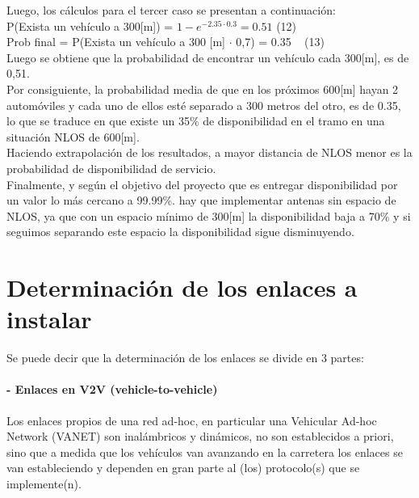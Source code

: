 \documentclass[12pt]{article}
\begin{document}
Luego, los cálculos para el tercer caso se presentan a continuación:\\

P(Exista un vehículo a 300[m]) = $1-e^{-2.35 \cdot 0.3} = 0.51$ \qquad \qquad \qquad
\footnotesize (12) \normalsize \\

Prob final = P(Exista un vehículo a 300 [m] $\cdot$ 0,7) = 0.35 \qquad \ \qquad 
\footnotesize (13) \normalsize\\

Luego se obtiene que la probabilidad de encontrar un vehículo cada 300[m], es de 0,51.\\

Por consiguiente, la probabilidad media de que en los próximos 600[m] hayan 2 automóviles y cada uno 
de ellos esté separado a 300 metros del otro, es de 0.35, lo que se traduce en que existe un 35\% de 
disponibilidad en el tramo en una situación NLOS de 600[m].\\

Haciendo extrapolación de los resultados, a mayor distancia de NLOS menor es la probabilidad de 
disponibilidad de servicio.\\

Finalmente, y según el objetivo del proyecto que es entregar disponibilidad por un valor lo más cercano 
a 99.99\%. hay que implementar antenas sin espacio de NLOS, ya que con un espacio mínimo de 300[m] la 
disponibilidad baja a 70\% y si seguimos separando este espacio la disponibilidad sigue disminuyendo.\\

\newpage
\section{Determinación de los enlaces a instalar}
Se puede decir que la determinación de los enlaces se divide en 3 partes:

\paragraph{- Enlaces en V2V (vehicle-to-vehicle)\\}
Los enlaces propios de una red ad-hoc, en particular una Vehicular Ad-hoc Network (VANET) son 
inalámbricos y dinámicos, no son 
establecidos a priori, sino que a medida que los vehículos van avanzando en la carretera los enlaces se 
van estableciendo y dependen en gran parte al (los) protocolo(s) que se implemente(n).\\
\end{document}
